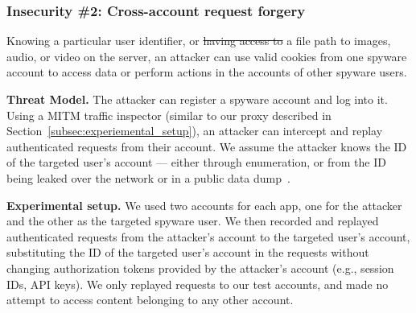 \documentclass[sigconf,balance=false]{acmart}
\newcommand{\sumanth}[1]{\textcolor{violet}{\noindent[SR: #1]}}
\newcommand{\damon}[1]{\textcolor{blue}{\noindent[DM: #1]}}
\newcommand{\geoff}[1]{\textcolor{purple}{\noindent[GV: #1]}}
\newcommand{\sumanth}[1]{}
\newcommand{\geoff}[1]{}
\newcommand{\damon}[1]{}
\providecommand{\DIFadd}[1]{{\protect\color{blue}\uwave{#1}}} %
\providecommand{\DIFdel}[1]{{\protect\color{red}\sout{#1}}}                      %
\providecommand{\DIFaddbegin}{} %
\providecommand{\DIFaddend}{} %
\providecommand{\DIFdelbegin}{} %
\providecommand{\DIFdelend}{} %
\newcommand{\DIFscaledelfig}{0.5}
\newlength{\DIFdelgraphicswidth} %
\newlength{\DIFdelgraphicsheight} %
\newcommand{\DIFaddincludegraphics}[2][]{{\color{blue}\fbox{\DIFOincludegraphics[#1]{#2}}}} %
\newcommand{\DIFdelincludegraphics}[2][]{%
\sbox{\DIFdelgraphicsbox}{\DIFOincludegraphics[#1]{#2}}%
\settoboxwidth{\DIFdelgraphicswidth}{\DIFdelgraphicsbox} %
\settoboxtotalheight{\DIFdelgraphicsheight}{\DIFdelgraphicsbox} %
\scalebox{\DIFscaledelfig}{%
\parbox[b]{\DIFdelgraphicswidth}{\usebox{\DIFdelgraphicsbox}\\[-\baselineskip] \rule{\DIFdelgraphicswidth}{0em}}\llap{\resizebox{\DIFdelgraphicswidth}{\DIFdelgraphicsheight}{%
\setlength{\unitlength}{\DIFdelgraphicswidth}%
\begin{picture}(1,1)%
\thicklines\linethickness{2pt} %
{\color[rgb]{1,0,0}\put(0,0){\framebox(1,1){}}}%
{\color[rgb]{1,0,0}\put(0,0){\line( 1,1){1}}}%
{\color[rgb]{1,0,0}\put(0,1){\line(1,-1){1}}}%
\end{picture}%
}\hspace*{3pt}}} %
} %
\DeclareRobustCommand{\DIFaddbegin}{\DIFOaddbegin \let\includegraphics\DIFaddincludegraphics} %
\DeclareRobustCommand{\DIFaddend}{\DIFOaddend \let\includegraphics\DIFOincludegraphics} %
\DeclareRobustCommand{\DIFdelbegin}{\DIFOdelbegin \let\includegraphics\DIFdelincludegraphics} %
\DeclareRobustCommand{\DIFdelend}{\DIFOaddend \let\includegraphics\DIFOincludegraphics} %
\begin{document}
\subsubsection*{Insecurity \#2: Cross-account request forgery}

Knowing a particular user identifier, or \DIFdelbegin \DIFdel{having access to }\DIFdelend a file path \DIFaddbegin \DIFadd{that provides access }\DIFaddend to images, audio, or video on the server, an attacker can use valid
cookies from one spyware account to access data or perform actions in
the accounts of other spyware users.

\textbf{Threat Model.} The attacker can register a spyware account and
log into it. Using a MITM traffic inspector (similar to our proxy
described in Section~\ref{subsec:experiemental_setup}), an attacker
can intercept and replay authenticated requests from their account. We
assume the attacker knows the ID of the targeted user's account ---
either through enumeration, or from the ID being leaked over the
network or in a public data dump~\cite{mSpybrea38:online,
  Companyt8:online, HackerSt66:online, Cerberus12:online,
  Stalkerw59:online}.


\textbf{Experimental setup.} We used two accounts for each app, one
for the attacker and the other as the targeted spyware user.  We then
recorded and replayed authenticated requests from the attacker's
account to the targeted user's account, substituting the ID of the
targeted user's account in the requests without changing authorization
tokens provided by the attacker's account (e.g., session IDs, API
keys).  We only replayed requests to our test accounts, and
made no attempt to access content belonging to any other account.

\end{document}
